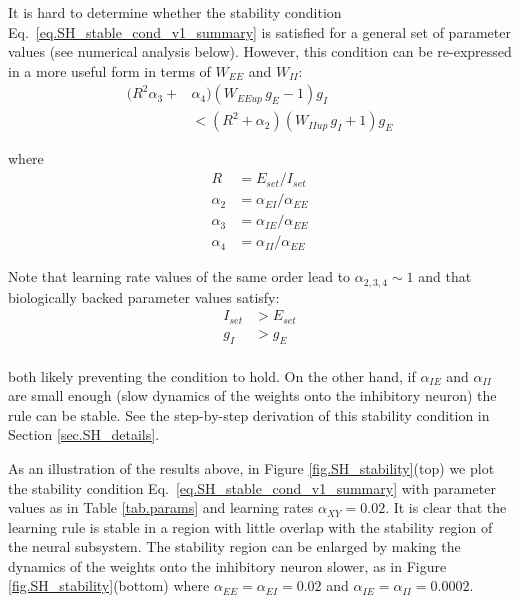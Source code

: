 \documentclass[twocolumn]{article}
\newcommand{\EE}{\mathit{EE}}
\newcommand{\EI}{\mathit{EI}}
\newcommand{\IE}{\mathit{IE}}
\newcommand{\II}{\mathit{II}}
\newcommand{\XY}{\mathit{XY}}
\newcommand{\set}{\mathit{set}}
\newcommand{\up}{\mathit{up}}
\begin{document}
It is hard to determine whether the stability condition Eq.\ \ref{eq.SH_stable_cond_v1_summary} is satisfied for a general set of parameter values (see numerical analysis below). However, this condition can be re-expressed in a more useful form in terms of $W_{\EE}$ and $W_{\II}$:
\begin{equation}
\begin{aligned}
(R^2 \alpha_3 + & \alpha_4)(W_{\EE\up} \, g_E  - 1)g_I \\
& < (R^2 + \alpha_2)(W_{\II\up} \, g_I + 1)g_E
\end{aligned}
\label{eq.SH_stable_cond_v2_summary}
\end{equation}

\noindent where
\begin{displaymath}
\begin{aligned}
R & = E_{\set}/I_{\set} \\
\alpha_2 & = \alpha_{\EI}/\alpha_{\EE} \\
\alpha_3 & = \alpha_{\IE}/\alpha_{\EE} \\
\alpha_4 & = \alpha_{\II}/\alpha_{\EE}
\end{aligned}
\end{displaymath}

\noindent Note that learning rate values of the same order lead to $\alpha_{2,3,4} \sim 1$ and that biologically backed parameter values satisfy: 
\begin{displaymath}
\begin{aligned}
I_{\set} & > E_{\set} \\
g_I & > g_E \\
\end{aligned}
\end{displaymath}

\noindent both likely preventing the condition to hold. On the other hand, if $\alpha_{\IE}$ and $\alpha_{\II}$ are small enough (slow dynamics of the weights onto the inhibitory neuron) the rule can be stable. See the step-by-step derivation of this stability condition in Section \ref{sec.SH_details}.

As an illustration of the results above, in Figure \ref{fig.SH_stability}(top) we plot the stability condition Eq.\ \ref{eq.SH_stable_cond_v1_summary} with parameter values as in Table \ref{tab.params} and learning rates $\alpha_{\XY} = 0.02$. It is clear that the learning rule is stable in a region with little overlap with the stability region of the neural subsystem. The stability region can be enlarged by making the dynamics of the weights onto the inhibitory neuron slower, as in Figure \ref{fig.SH_stability}(bottom) where $\alpha_{\EE}=\alpha_{\EI}=0.02$ and $\alpha_{\IE}=\alpha_{\II}=0.0002$.
\end{document}
